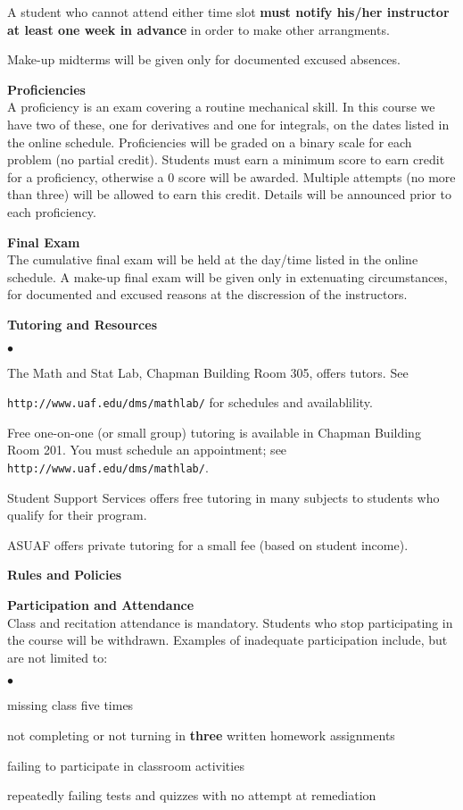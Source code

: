 \documentclass[12pt]{article}
\renewcommand{\emph}[1]{\textsf{\textbf{#1}}}
\newcommand{\localhead}[1]{\par\smallskip\textbf{#1}\nobreak\\}%
\def\heading#1{\localhead{\large\emph{#1}}}
\def\subheading#1{\localhead{\emph{#1}}}
\newenvironment{clist}%
{\bgroup\parskip 0pt\begin{list}{$\bullet$}{\partopsep 4pt\topsep 0pt\itemsep -2pt}}%
{\end{list}\egroup}%
\begin{document}
A student who cannot attend either time slot \emph{must notify his/her instructor at least one week in advance} in order to make other arrangments.

Make-up midterms will be given only for documented excused absences.

\heading{Proficiencies}
A proficiency is an exam covering a routine mechanical skill.  In
this course we have two of these, one for derivatives and one for 
integrals, on the dates listed in the online schedule.  
Proficiencies will be graded on a binary scale for each problem
(no partial credit).  Students must earn a minimum score to earn credit
for a proficiency, otherwise a 0 score will be awarded. Multiple 
attempts (no more than three)
will be allowed to earn this
credit.  Details will be announced prior to each proficiency.

\heading{Final Exam} 
The cumulative final exam will be held at the day/time listed in the
online schedule. A make-up final exam will be given only in extenuating circumstances, for documented and excused reasons at the discression of the instructors.

\heading{Tutoring and Resources}
\vskip -30pt\strut
\begin{clist}
	\item The Math and Stat Lab, Chapman Building Room 305, offers tutors. 
	See 

	\texttt{http://www.uaf.edu/dms/mathlab/} for schedules and availablility.
	\item Free
one-on-one (or small group) tutoring is available in 
Chapman Building Room 201. You must schedule an
appointment; see \texttt{http://www.uaf.edu/dms/mathlab/}.
	\item Student Support Services offers free tutoring in many subjects to students who qualify for their program.
	\item ASUAF offers private tutoring for a small fee (based on student income).
\end{clist}

\heading{Rules and Policies}
\vskip -20pt
\subheading{Participation and Attendance}
Class and recitation attendance is mandatory. Students who stop participating in the course will be withdrawn. Examples of inadequate participation include,
but are not limited to:
\begin{clist}
\item missing class five times
\item not completing or not turning in \textbf{three} written homework assignments
\item failing to participate in classroom activities
\item repeatedly failing tests and quizzes with no attempt at remediation
\end{clist}
\end{document}
